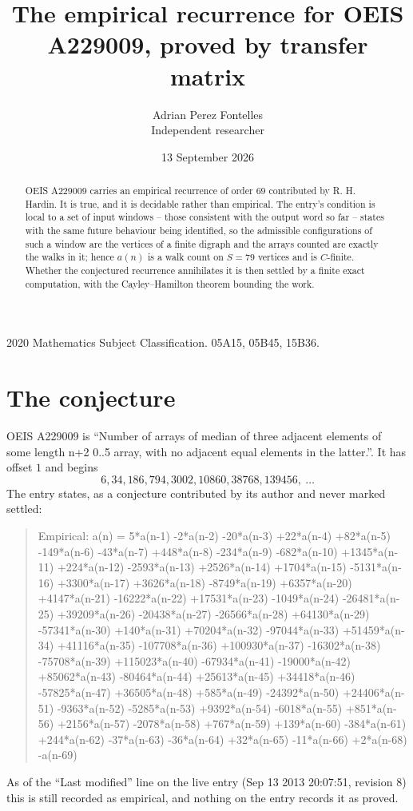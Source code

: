 \documentclass[11pt,a4paper]{article}
\title{The empirical recurrence for OEIS A229009, proved by transfer matrix}
\author{Adrian Perez Fontelles\\ \small Independent researcher}
\date{13 September 2026}
\theoremstyle{plain}
\theoremstyle{definition}
\begin{document}
\maketitle

\begin{abstract}
OEIS A229009 carries an empirical recurrence of order $69$ contributed by R. H. Hardin. It is
true, and it is decidable rather than empirical. The entry's condition is local to a set of input windows -- those consistent with the output word so far -- states with the same future behaviour being identified, so
the admissible configurations of such a window are the vertices of a finite digraph and the
arrays counted are exactly the walks in it; hence $a(n)$ is a walk count on $S=79$ vertices
and is $C$-finite. Whether the conjectured recurrence annihilates it is then settled by a
finite exact computation, with the Cayley--Hamilton theorem bounding the work.
\end{abstract}

\noindent\small 2020 Mathematics Subject Classification. 05A15, 05B45, 15B36.\normalsize

\section{The conjecture}

OEIS A229009 is ``Number of arrays of median of three adjacent elements of some length n+2 0..5 array, with no adjacent equal elements in the latter.''. It has offset $1$ and begins
\[
6, 34, 186, 794, 3002, 10860, 38768, 139456,\ \dots
\]
The entry states, as a conjecture contributed by its author and never marked settled:
\begin{quote}
Empirical: a(n) = 5*a(n-1) -2*a(n-2) -20*a(n-3) +22*a(n-4) +82*a(n-5) -149*a(n-6) -43*a(n-7) +448*a(n-8) -234*a(n-9) -682*a(n-10) +1345*a(n-11) +224*a(n-12) -2593*a(n-13) +2526*a(n-14) +1704*a(n-15) -5131*a(n-16) +3300*a(n-17) +3626*a(n-18) -8749*a(n-19) +6357*a(n-20) +4147*a(n-21) -16222*a(n-22) +17531*a(n-23) -1049*a(n-24) -26481*a(n-25) +39209*a(n-26) -20438*a(n-27) -26566*a(n-28) +64130*a(n-29) -57341*a(n-30) +140*a(n-31) +70204*a(n-32) -97044*a(n-33) +51459*a(n-34) +41116*a(n-35) -107708*a(n-36) +100930*a(n-37) -16302*a(n-38) -75708*a(n-39) +115023*a(n-40) -67934*a(n-41) -19000*a(n-42) +85062*a(n-43) -80464*a(n-44) +25613*a(n-45) +34418*a(n-46) -57825*a(n-47) +36505*a(n-48) +585*a(n-49) -24392*a(n-50) +24406*a(n-51) -9363*a(n-52) -5285*a(n-53) +9392*a(n-54) -6018*a(n-55) +851*a(n-56) +2156*a(n-57) -2078*a(n-58) +767*a(n-59) +139*a(n-60) -384*a(n-61) +244*a(n-62) -37*a(n-63) -36*a(n-64) +32*a(n-65) -11*a(n-66) +2*a(n-68) -a(n-69)
\end{quote}
As of the ``Last modified'' line on the live entry (Sep 13 2013 20:07:51, revision 8) this is still
recorded as empirical, and nothing on the entry records it as proved.
\end{document}
